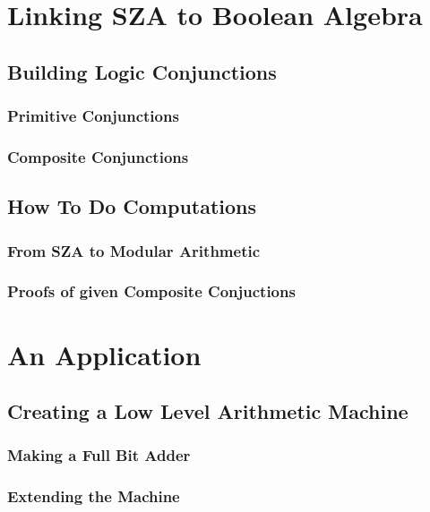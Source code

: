 \documentclass[12pt]{report}
\theoremstyle{definition}
\theoremstyle{remark}
\begin{document}
\chapter{Linking SZA to Boolean Algebra}
  \section{Building Logic Conjunctions}
    \subsection{Primitive Conjunctions}

    \subsection{Composite Conjunctions}

  \section{How To Do Computations}
    \subsection{From SZA to Modular Arithmetic}
    \subsection{Proofs of given Composite Conjuctions}

\newpage

\chapter{An Application}
  \section{Creating a Low Level Arithmetic Machine}
    \subsection{Making a Full Bit Adder}

    \subsection{Extending the Machine}
\end{document}
